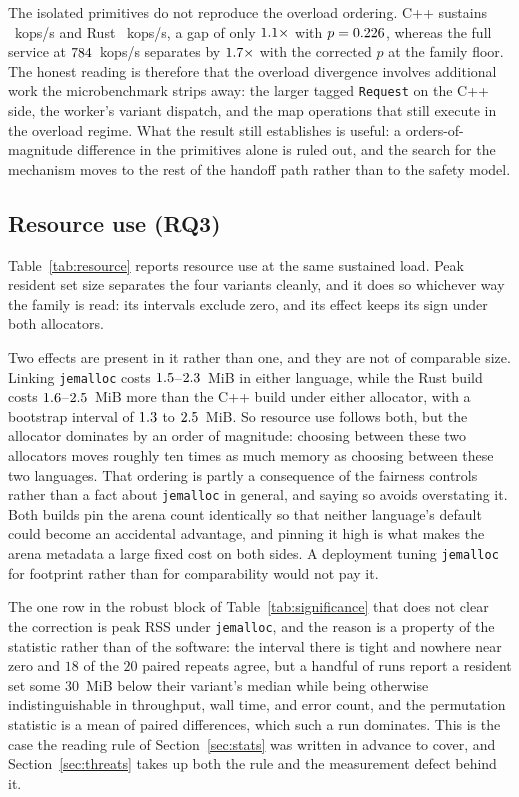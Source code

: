 \documentclass[english,twoside,openright,a4paper,censored,csm,software-track-2020]{HYthesisML}
\begin{document}
The isolated primitives do not reproduce the overload ordering. C++ sustains
\ContentionThrCpp{}~kops/s and Rust \ContentionThrRust{}~kops/s, a gap of only
$1.1\times$ with $p = 0.226$, whereas the full service at
$784$~kops/s separates by $1.7\times$ with the corrected $p$ at the
family floor. The honest reading is therefore that the overload divergence involves additional
work the microbenchmark strips away: the larger tagged \texttt{Request} on the C++ side, the
worker's variant dispatch, and the map operations that still execute in the overload regime.
What the result still establishes is useful: a orders-of-magnitude difference in the primitives
alone is ruled out, and the search for the mechanism moves to the rest of the handoff path rather
than to the safety model.

\subsection{Resource use (RQ3)}\label{sec:resources}
Table~\ref{tab:resource} reports resource use at the same
sustained load. Peak resident set size separates the four variants cleanly, and it does so
whichever way the family is read: its intervals exclude zero, and its effect keeps its sign under
both allocators.

Two effects are present in it rather than one, and they are not of comparable size. Linking
\texttt{jemalloc} costs $1.5$--$2.3$~MiB in either language, while the Rust
build costs $1.6$--$2.5$~MiB more than the C++ build under either allocator,
with a bootstrap interval of $1.3$ to $2.5$~MiB. So resource use follows both,
but the allocator dominates by an order of magnitude: choosing between these two allocators moves
roughly ten times as much memory as choosing between these two languages. That ordering is partly
a consequence of the fairness controls rather than a fact about \texttt{jemalloc} in general, and
saying so avoids overstating it. Both builds pin the arena count identically so that neither
language's default could become an accidental advantage, and pinning it high is what makes the
arena metadata a large fixed cost on both sides. A deployment tuning \texttt{jemalloc} for
footprint rather than for comparability would not pay it.

The one row in the robust block of Table~\ref{tab:significance} that does not clear the
correction is peak RSS under
\texttt{jemalloc}, and the reason is a property of the statistic rather than of the software: the
interval there is tight and nowhere near zero and $18$ of the $20$ paired repeats agree, but a
handful of runs report a resident set some $30$~MiB below their variant's median while being
otherwise indistinguishable in throughput, wall time, and error count, and the permutation
statistic is a mean of paired differences, which such a run dominates. This is the case the
reading rule of Section~\ref{sec:stats} was written in advance to cover, and
Section~\ref{sec:threats} takes up both the rule and the measurement defect behind it.
\end{document}
